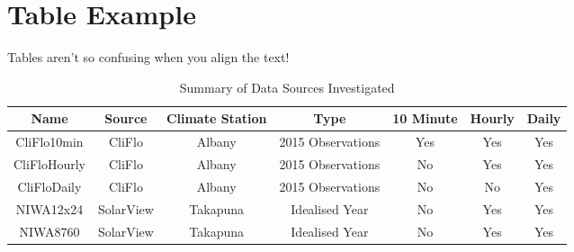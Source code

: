 \documentclass[document.tex]{subfiles}
\begin{document}
\chapter{Table Example}
Tables aren't so confusing when you align the text!

\begin{table}[h]
    \caption{Summary of Data Sources Investigated}
    \label{tbl:data_summary}
    \centering 
    \small
    \begin{tabular}{|c|c|c|c|c|c|c|}
        \hline
                   \rowcolor{lightgreen}
                   \textbf{Name} & \textbf{Source}  & \textbf{Climate Station}  & \textbf{Type}     & \textbf{10 Minute}   & \textbf{Hourly}    & \textbf{Daily}
        \\ \hline
                    CliFlo10min  &  CliFlo          & Albany                    & 2015 Observations & Yes                               & Yes                                            & Yes
        \\ \hline
                    CliFloHourly &  CliFlo          & Albany                    & 2015 Observations & \cellcolor{uoaSilverLining} No    & Yes                                            & Yes
        \\ \hline
                    CliFloDaily  &  CliFlo          & Albany                    & 2015 Observations & \cellcolor{uoaSilverLining} No    & \cellcolor{uoaSilverLining} No                 & Yes
        \\ \hline
                    NIWA12x24    &  SolarView       & Takapuna                  & Idealised Year    & \cellcolor{uoaSilverLining} No    & Yes                                            & Yes 
        \\ \hline
                    NIWA8760     &  SolarView       & Takapuna                  & Idealised Year    & \cellcolor{uoaSilverLining} No    & Yes                                            & Yes
        \\ \hline
    \end{tabular}
\end{table}
\end{document}
